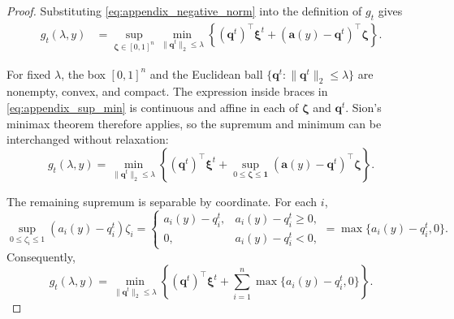 \documentclass[preprint,12pt,authoryear]{elsarticle}
\theoremstyle{definition}
\begin{document}
\begin{proof}
{Substituting \eqref{eq:appendix_negative_norm} into the definition of $g_t$ gives
\begin{align}
g_t(\lambda,y)
&=
\sup_{\boldsymbol{\zeta}\in[0,1]^n}
\min_{\|\boldsymbol{q}^{t}\|_2\leq\lambda}
\left\{
(\boldsymbol{q}^{t})^\top\boldsymbol{\xi}^t
+(\boldsymbol{a}(y)-\boldsymbol{q}^{t})^\top\boldsymbol{\zeta}
\right\}.
\label{eq:appendix_sup_min}
\end{align}

For fixed $\lambda$, the box $[0,1]^n$ and the Euclidean ball
$\{\boldsymbol{q}^{t}:\|\boldsymbol{q}^{t}\|_2\leq\lambda\}$ are nonempty, convex, and compact. The expression inside braces in \eqref{eq:appendix_sup_min} is continuous and affine in each of $\boldsymbol{\zeta}$ and $\boldsymbol{q}^{t}$. Sion's minimax theorem therefore applies, so the supremum and minimum can be interchanged without relaxation:
\begin{equation}
g_t(\lambda,y)
=
\min_{\|\boldsymbol{q}^{t}\|_2\leq\lambda}
\left\{
(\boldsymbol{q}^{t})^\top\boldsymbol{\xi}^t
+
\sup_{0\leq\boldsymbol{\zeta}\leq\boldsymbol{1}}
(\boldsymbol{a}(y)-\boldsymbol{q}^{t})^\top\boldsymbol{\zeta}
\right\}.
\label{eq:appendix_minimax}
\end{equation}


The remaining supremum is separable by coordinate. For each $i$,
\begin{equation}
\sup_{0\leq\zeta_i\leq1}
(a_i(y)-q_i^t)\zeta_i
=
\begin{cases}
a_i(y)-q_i^t, & a_i(y)-q_i^t\geq0,\\
0, & a_i(y)-q_i^t<0,
\end{cases}
=\max\{a_i(y)-q_i^t,0\}.
\label{eq:appendix_box_coordinate}
\end{equation}
Consequently,
\begin{equation}
g_t(\lambda,y)
=
\min_{\|\boldsymbol{q}^{t}\|_2\leq\lambda}
\left\{
(\boldsymbol{q}^{t})^\top\boldsymbol{\xi}^t
+\sum_{i=1}^{n}\max\{a_i(y)-q_i^t,0\}
\right\}.
\label{eq:appendix_positive_part}
\end{equation}


}
\end{proof}
\end{document}
